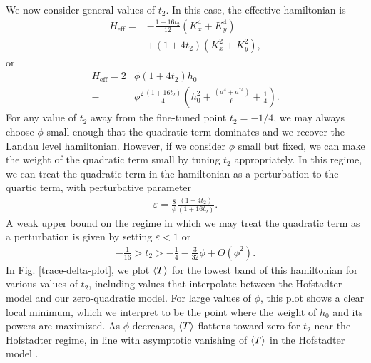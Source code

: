 \documentclass[aps,prb,twocolumn,letterpaper,twoside,nobalancelastpage,groupedaddress,amsmath,amssymb,floatfix,citeautoscript]{revtex4-1}
\begin{document}
We now consider general values of $t_2$. In this case, the effective hamiltonian is
\begin{align}
\label{t2-hamiltonian}
H_{\text{eff}} = &-\frac{1 + 16t_2}{12}\left(K_x^4 + K_y^4\right)\nonumber\\ &+ \left(1 + 4t_2\right) \left(K_x^2 + K_y^2\right),
\end{align}
or
\begin{align*}
H_{\text{eff}} = 2&\phi\left(1 + 4t_2\right) h_0\\  - &\phi^2\frac{\left(1 + 16t_2\right)}{4} \left(h_0^2 + \frac{\left(a^{4} + a^{\dag 4}\right)}{6} + \frac{1}{4}\right).
\end{align*}
For any value of $t_2$ away from the fine-tuned point $t_2 = -1/4$, we may always choose $\phi$ small enough that the quadratic term dominates and we recover the Landau level hamiltonian. However, if we consider $\phi$ small but fixed, we can make the weight of the quadratic term small by tuning $t_2$ appropriately. In this regime, we can treat the quadratic term in the hamiltonian as a perturbation to the quartic term, with perturbative parameter
\begin{align*}
\varepsilon = \frac{8}{\phi}\frac{\left(1 + 4t_2\right)}{\left(1 + 16t_2\right)}.
\end{align*}
A weak upper bound on the regime in which we may treat the quadratic term as a perturbation is given by setting $\varepsilon < 1$ or
\begin{align*}
-\frac{1}{16} > t_2 > -\frac{1}{4} - \frac{3}{32}\phi +O(\phi^2).
\end{align*}
In Fig. \ref{trace-delta-plot}, we plot $\expval{T}$ for the lowest band of this hamiltonian for various values of $t_2$, including values that interpolate between the Hofstadter model and our zero-quadratic model. 
For large values of $\phi$, this plot shows a clear local minimum, which we interpret to be the point where the weight of $h_0$ and its powers are maximized. As $\phi$ decreases, $\expval{T}$ flattens toward zero for $t_2$ near the Hofstadter regime, in line with asymptotic vanishing of $\expval{T}$ in the Hofstadter model \cite{bauer_quantum_2016}. 
\end{document}
